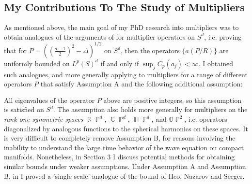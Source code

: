 \documentclass[11pt]{article}
\DeclareMathOperator{\RR}{\mathbb{R}}
\DeclareMathOperator{\HH}{\mathbb{H}}
\DeclareMathOperator{\CC}{\mathbb{C}}
\DeclareMathOperator{\PP}{\mathbb{P}}
\begin{document}



\subsection{My Contributions To The Study of Multipliers} \label{ContributionMultipliers}

As mentioned above, the main goal of my PhD research into multipliers was to obtain analogues of the arguments of \cite{HeoNazarovSeeger,Cladek,KimQuasiradial} for multiplier operators on $S^d$, i.e. proving that for $P = ( ({\scriptstyle \frac{d-1}{2} })^2 - \Delta )^{1/2}$ on $S^d$, then the operators $\{ a(P/R) \}$ are uniformly bounded on $L^p(S)^d$ if and only if $\sup_j C_p(a_j) < \infty$. I obtained such analogues, and more generally applying to multipliers for a range of different operators $P$ that satisfy Assumption A and the following additional assumption:
%
\begin{center}
\end{center}
%
All eigenvalues of the operator $P$ above are positive integers, so this assumption is satisfied on $S^d$. The assumption also holds more generally for multipliers on the \emph{rank one symmetric spaces} $\RR \PP^d$, $\CC \PP^d$, $\HH \PP^d$, and $\mathbb{O} \PP^2$, i.e. operators diagonalized by analogous functions to the spherical harmonics on these spaces. It is very difficult to completely remove Assumption B, for reasons involving the inability to understand the large time behavior of the wave equation on compact manifolds. Nonetheless, in Section 3 I discuss potential methods for obtaining similar bounds under weaker assumptions. Under Assumption A and Assumption B, in \cite{DensonCharacterization} I proved a 'single scale' analogue of the bound of Heo, Nazarov and Seeger.
\end{document}
